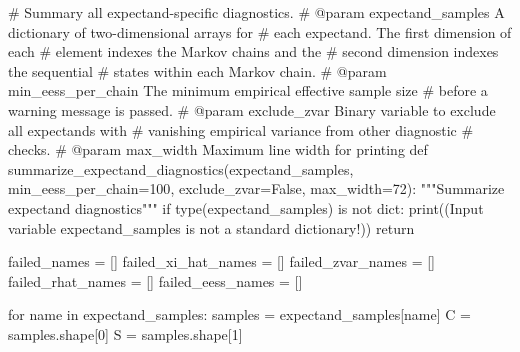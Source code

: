 \documentclass[
  letterpaper,
  DIV=11,
  numbers=noendperiod]{scrartcl}
\newenvironment{Shaded}{\begin{snugshade}}{\end{snugshade}}
\newcommand{\BuiltInTok}[1]{\textcolor[rgb]{0.00,0.23,0.31}{#1}}
\newcommand{\CommentTok}[1]{\textcolor[rgb]{0.37,0.37,0.37}{#1}}
\newcommand{\ControlFlowTok}[1]{\textcolor[rgb]{0.00,0.23,0.31}{#1}}
\newcommand{\DecValTok}[1]{\textcolor[rgb]{0.68,0.00,0.00}{#1}}
\newcommand{\KeywordTok}[1]{\textcolor[rgb]{0.00,0.23,0.31}{#1}}
\newcommand{\NormalTok}[1]{\textcolor[rgb]{0.00,0.23,0.31}{#1}}
\newcommand{\OperatorTok}[1]{\textcolor[rgb]{0.37,0.37,0.37}{#1}}
\newcommand{\StringTok}[1]{\textcolor[rgb]{0.13,0.47,0.30}{#1}}
\newcommand{\VariableTok}[1]{\textcolor[rgb]{0.07,0.07,0.07}{#1}}
\begin{document}
\begin{Shaded}
\begin{Highlighting}[]
\CommentTok{\# Summary all expectand{-}specific diagnostics.}
\CommentTok{\# @param expectand\_samples A dictionary of two{-}dimensional arrays for }
\CommentTok{\#                          each expectand.  The first dimension of each}
\CommentTok{\#                          element indexes the Markov chains and the }
\CommentTok{\#                          second dimension indexes the sequential }
\CommentTok{\#                          states within each Markov chain.}
\CommentTok{\# @param min\_eess\_per\_chain The minimum empirical effective sample size}
\CommentTok{\#                           before a warning message is passed.}
\CommentTok{\# @param exclude\_zvar Binary variable to exclude all expectands with}
\CommentTok{\#                     vanishing empirical variance from other diagnostic}
\CommentTok{\#                     checks.}
\CommentTok{\# @param max\_width Maximum line width for printing}
\KeywordTok{def}\NormalTok{ summarize\_expectand\_diagnostics(expectand\_samples,}
\NormalTok{                                    min\_eess\_per\_chain}\OperatorTok{=}\DecValTok{100}\NormalTok{,}
\NormalTok{                                    exclude\_zvar}\OperatorTok{=}\VariableTok{False}\NormalTok{,}
\NormalTok{                                    max\_width}\OperatorTok{=}\DecValTok{72}\NormalTok{):}
  \CommentTok{"""Summarize expectand diagnostics"""}
  \ControlFlowTok{if} \BuiltInTok{type}\NormalTok{(expectand\_samples) }\KeywordTok{is} \KeywordTok{not} \BuiltInTok{dict}\NormalTok{:}
    \BuiltInTok{print}\NormalTok{((}\StringTok{\textquotesingle{}Input variable \textasciigrave{}expectand\_samples\textasciigrave{} \textquotesingle{}}
           \StringTok{\textquotesingle{}is not a standard dictionary!\textquotesingle{}}\NormalTok{))}
    \ControlFlowTok{return}
  
\NormalTok{  failed\_names }\OperatorTok{=}\NormalTok{ []}
\NormalTok{  failed\_xi\_hat\_names }\OperatorTok{=}\NormalTok{ []}
\NormalTok{  failed\_zvar\_names }\OperatorTok{=}\NormalTok{ []}
\NormalTok{  failed\_rhat\_names }\OperatorTok{=}\NormalTok{ []}
\NormalTok{  failed\_eess\_names }\OperatorTok{=}\NormalTok{ []}

  \ControlFlowTok{for}\NormalTok{ name }\KeywordTok{in}\NormalTok{ expectand\_samples:}
\NormalTok{    samples }\OperatorTok{=}\NormalTok{ expectand\_samples[name]}
\NormalTok{    C }\OperatorTok{=}\NormalTok{ samples.shape[}\DecValTok{0}\NormalTok{]}
\NormalTok{    S }\OperatorTok{=}\NormalTok{ samples.shape[}\DecValTok{1}\NormalTok{]}
    

\end{Highlighting}
\end{Shaded}
\end{document}
